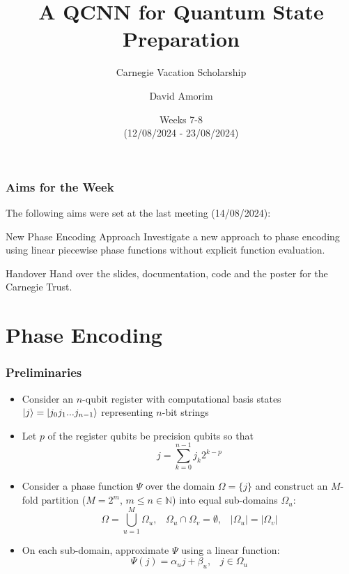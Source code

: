 \documentclass{beamer}
\title[QCNN State Preparation]{A QCNN for Quantum State Preparation}
\subtitle{Carnegie Vacation Scholarship}
\author[David Amorim]{David Amorim}
\institute[]{}
\date[21/08/2024]{Weeks 7-8 \\(12/08/2024 - 23/08/2024)}
\begin{document}
\frame{\titlepage}

\begin{frame}
\frametitle{Aims for the Week}
The following aims were set at the last meeting (14/08/2024):

\begin{alertblock}{New Phase Encoding Approach}
Investigate a new approach to phase encoding using linear piecewise phase functions without explicit function evaluation.  
\end{alertblock}

\begin{alertblock}{Handover}
Hand over the slides, documentation, code and the poster for the Carnegie Trust.
\end{alertblock}
\end{frame}

\section{Phase Encoding}

\begin{frame}
\frametitle{Preliminaries}

\begin{itemize}
\item Consider an \alert{$n$-qubit} register with computational basis states $\ket{j} = \ket{j_0 j_1 ... j_{n-1}}$ representing $n$-bit strings
\item Let \alert{$p$} of the register qubits be \alert{precision qubits} so that 
\begin{equation}
j = \sum^{n -1}_{k=0} j_k 2^{k-p}
\end{equation} 
\item Consider a \alert{phase function} $\Psi$ over the domain $\Omega = \{ j \}$ and construct an \alert{$M$-fold partition} ($M = 2^m$, $m \leq n \in \mathbb{N}$) into equal sub-domains $\Omega_u$:
\begin{equation}
\Omega = \bigcup_{u=1}^M \Omega_u, \; \; \; \Omega_u \cap \Omega_v = \emptyset, \;  \; \; |\Omega_u| = |\Omega_v|
\end{equation}
\item On each sub-domain, approximate $\Psi$ using a \alert{linear function}:
\begin{equation}
\Psi(j) = \alpha_u j + \beta_u, \; \; \; j \in \Omega_u
\end{equation}
\end{itemize}

\end{frame}
\end{document}
